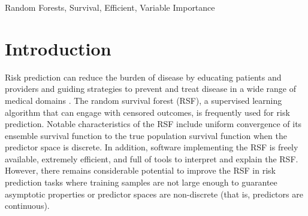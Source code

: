 \documentclass[twoside,11pt]{article}\usepackage[]{graphicx}\usepackage[]{color}
\newcommand{\ie}{that is}
\begin{document}
\begin{abstract}%

The oblique random survival forest (ORSF) is an ensemble method for supervised learning that extends the random survival forest (RSF). Trees in the ORSF are grown using linear combinations of variables to create branches in the tree, whereas in the RSF a single variable is used. ORSF ensembles often have higher prediction accuracy than RSF ensembles, but the additional computational overhead of fitting ORSF ensembles limits their scope of application. In addition, few methods have been developed for interpretation of ORSF ensembles. In this article, we introduce and evaluate methods to accelerate the ORSF (\ie, reduce computational overhead) and compute the importance of individual variables in the ORSF We show that our strategy to accelerate the ORSF is up to 500 times faster than existing software for ORSFs (the \texttt{obliqueRSF} R package), and that prediction accuracy of the accelerated ORSF is equivalent or superior to that of existing ORSF methods. We estimate importance of variables for the ORSF by negating each coefficient used for the given variable in linear combinations, and then computing the reduction in out-of-bag accuracy. We show with simulation that  `negation importance' can discriminate between signal and noise variables, and it outperforms several state-of-the-art variable importance techniques in this task when there is correlation among predictors.

\end{abstract}

\begin{keywords}
  Random Forests, Survival, Efficient, Variable Importance
\end{keywords}

\section{Introduction}

Risk prediction can reduce the burden of disease by educating patients and providers and guiding strategies to prevent and treat disease in a wide range of medical domains \citep{moons2012riskI, moons2012riskII}. The random survival forest (RSF), a supervised learning algorithm that can engage with censored outcomes, is frequently used for risk prediction. Notable characteristics of the RSF include uniform convergence of its ensemble survival function to the true population survival function when the predictor space is discrete. In addition, software implementing the RSF is freely available, extremely efficient, and full of tools to interpret and explain the RSF. However, there remains considerable potential to improve the RSF in risk prediction tasks where training samples are not large enough to guarantee asymptotic properties or predictor spaces are non-discrete (\ie, predictors are continuous).
\end{document}
